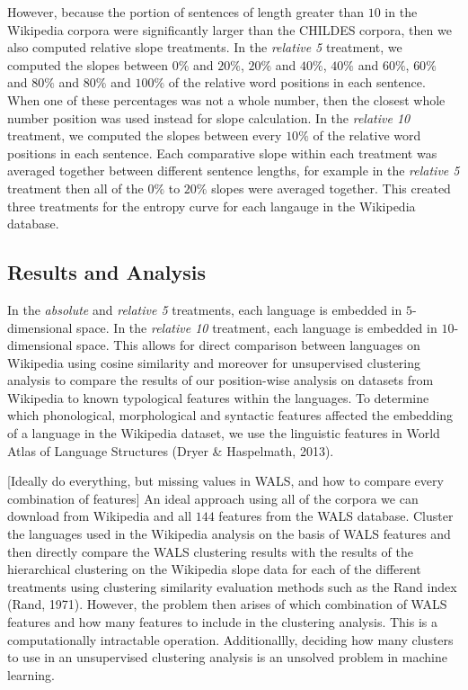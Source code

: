 \documentclass[10pt, letterpaper]{article}
\begin{document}
However, because the portion of sentences of length greater than \(10\)
in the Wikipedia corpora were significantly larger than the CHILDES
corpora, then we also computed relative slope treatments. In the
\emph{relative 5} treatment, we computed the slopes between \(0\%\) and
\(20\%\), \(20\%\) and \(40\%\), \(40\%\) and \(60\%\), \(60\%\) and
\(80\%\) and \(80\%\) and \(100\%\) of the relative word positions in
each sentence. When one of these percentages was not a whole number,
then the closest whole number position was used instead for slope
calculation. In the \emph{relative 10} treatment, we computed the slopes
between every \(10\%\) of the relative word positions in each sentence.
Each comparative slope within each treatment was averaged together
between different sentence lengths, for example in the \emph{relative 5}
treatment then all of the \(0\%\) to \(20\%\) slopes were averaged
together. This created three treatments for the entropy curve for each
langauge in the Wikipedia database.

\subsection{Results and Analysis}\label{results-and-analysis}

In the \emph{absolute} and \emph{relative 5} treatments, each language
is embedded in \(5\)-dimensional space. In the \emph{relative 10}
treatment, each language is embedded in \(10\)-dimensional space. This
allows for direct comparison between languages on Wikipedia using cosine
similarity and moreover for unsupervised clustering analysis to compare
the results of our position-wise analysis on datasets from Wikipedia to
known typological features within the languages. To determine which
phonological, morphological and syntactic features affected the
embedding of a language in the Wikipedia dataset, we use the linguistic
features in World Atlas of Language Structures (Dryer \& Haspelmath,
2013).

{[}Ideally do everything, but missing values in WALS, and how to compare
every combination of features{]} An ideal approach using all of the
corpora we can download from Wikipedia and all \(144\) features from the
WALS database. Cluster the languages used in the Wikipedia analysis on
the basis of WALS features and then directly compare the WALS clustering
results with the results of the hierarchical clustering on the Wikipedia
slope data for each of the different treatments using clustering
similarity evaluation methods such as the Rand index (Rand, 1971).
However, the problem then arises of which combination of WALS features
and how many features to include in the clustering analysis. This is a
computationally intractable operation. Additionallly, deciding how many
clusters to use in an unsupervised clustering analysis is an unsolved
problem in machine learning.
\end{document}
